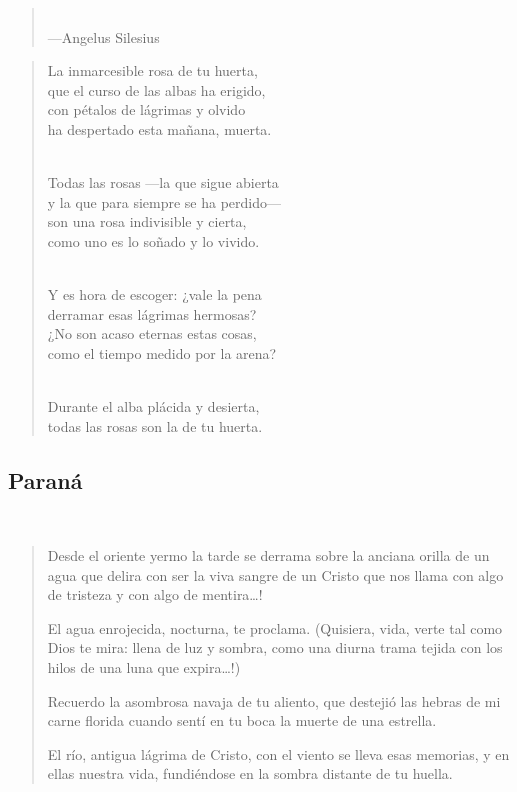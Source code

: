 \documentclass[a4paper, 12pt]{article}
\begin{document}
\begin{quote}
   
\scriptsize
{}\\
\hspace*{\fill}—Angelus Silesius
\end{quote}
\normalsize
\begin{verse}
    

La inmarcesible rosa de tu huerta,\\
que el curso de las albas ha erigido,\\
con pétalos de lágrimas y olvido\\
ha despertado esta mañana, muerta.\\
~ 

Todas las rosas —la que sigue abierta\\
y la que para siempre se ha perdido—\\
son una rosa indivisible y cierta,\\
como uno es lo soñado y lo vivido.\\
~ 

Y es hora de escoger: ¿vale la pena\\
derramar esas lágrimas hermosas?\\
¿No son acaso eternas estas cosas,\\
como el tiempo medido por la arena?\\
~ 

Durante el alba plácida y desierta,\\
todas las rosas son la de tu huerta.\\

\end{verse}

\pagebreak 
\subsection{Paraná}
~ 

\begin{verse}
Desde el oriente yermo la tarde se derrama
sobre la anciana orilla de un agua que delira
con ser la viva sangre de un Cristo que nos llama
con algo de tristeza y con algo de mentira…!
~

El agua enrojecida, nocturna, te proclama.
(Quisiera, vida, verte tal como Dios te mira:
llena de luz y sombra, como una diurna trama
tejida con los hilos de una luna que expira…!)
~

Recuerdo la asombrosa navaja de tu aliento,
que destejió las hebras de mi carne florida
cuando sentí en tu boca la muerte de una estrella.
~

El río, antigua lágrima de Cristo, con el viento
se lleva esas memorias, y en ellas nuestra vida,
fundiéndose en la sombra distante de tu huella.
\end{verse}
\end{document}
